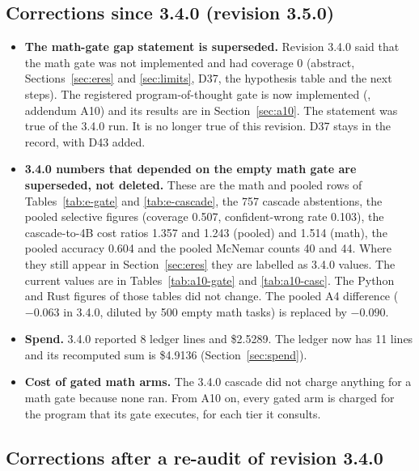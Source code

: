 \documentclass[11pt,a4paper]{article}
\newcommand{\code}[1]{\texttt{\detokenize{#1}}}
\begin{document}
\subsection{Corrections since 3.4.0 (revision 3.5.0)}\label{sec:corr350}

\begin{itemize}
\item \textbf{The math-gate gap statement is superseded.} Revision 3.4.0 said that the math gate was
  not implemented and had coverage 0 (abstract, Sections~\ref{sec:eres} and \ref{sec:limits}, D37, the
  hypothesis table and the next steps). The registered program-of-thought gate is now implemented
  (\code{gwaya/domains/math_gate.py}, addendum A10) and its results are in Section~\ref{sec:a10}. The
  statement was true of the 3.4.0 run. It is no longer true of this revision. D37 stays in the record, with
  D43 added.
\item \textbf{3.4.0 numbers that depended on the empty math gate are superseded, not deleted.} These are
  the math and pooled rows of Tables~\ref{tab:e-gate} and \ref{tab:e-cascade}, the 757 cascade abstentions,
  the pooled selective figures (coverage 0.507, confident-wrong rate 0.103), the cascade-to-4B cost ratios
  1.357 and 1.243 (pooled) and 1.514 (math), the pooled accuracy 0.604 and the pooled McNemar counts 40 and
  44. Where they still appear in Section~\ref{sec:eres} they are labelled as 3.4.0 values. The current
  values are in Tables~\ref{tab:a10-gate} and \ref{tab:a10-casc}. The Python and Rust figures of those tables
  did not change. The pooled A4 difference ($-0.063$ in 3.4.0, diluted by 500 empty math tasks) is replaced by
  $-0.090$.
\item \textbf{Spend.} 3.4.0 reported 8 ledger lines and \$2.5289. The ledger now has 11 lines and its
  recomputed sum is \$4.9136 (Section~\ref{sec:spend}).
\item \textbf{Cost of gated math arms.} The 3.4.0 cascade did not charge anything for a math gate because
  none ran. From A10 on, every gated arm is charged for the program that its gate executes, for each tier it
  consults.
\end{itemize}

\subsection{Corrections after a re-audit of revision 3.4.0}\label{sec:corr341}
\end{document}
